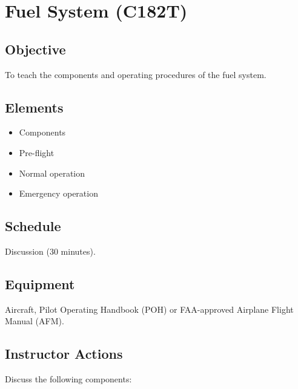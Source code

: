 \section{Fuel System (C182T)}

\subsection{Objective}

To teach the components and operating procedures of the fuel system.

\subsection{Elements}

\begin{itemize}
  \item Components
  \item Pre-flight
  \item Normal operation
  \item Emergency operation
\end{itemize}

\subsection{Schedule}

Discussion (30 minutes).

\subsection{Equipment}

Aircraft, Pilot Operating Handbook (POH) or FAA-approved Airplane Flight Manual (AFM).

\subsection{Instructor Actions}

Discuss the following components:

